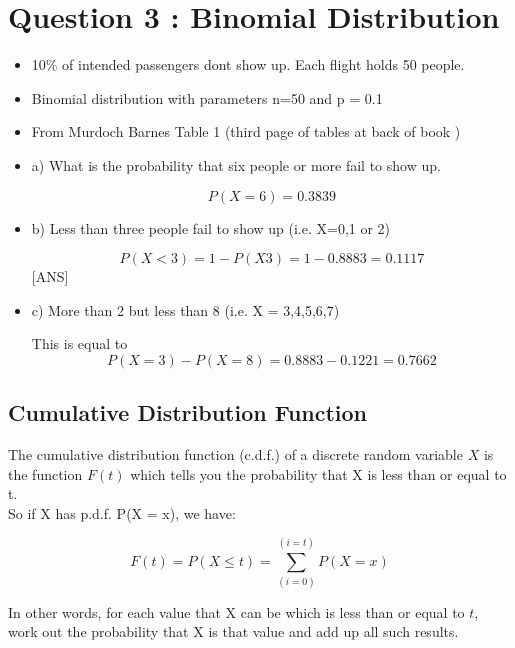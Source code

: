 \documentclass[]{report}
\begin{document}
\section{Question 3 : Binomial Distribution}

\begin{itemize}
	\item 10\% of intended passengers dont show up. Each flight holds 50 people.
	
	\item Binomial distribution with parameters n=50 and p = 0.1
	
	\item From Murdoch Barnes Table 1 (third page of tables at back of book )
\end{itemize}
\begin{itemize}
	\item a) What is the probability that six people or more fail to show up.
	
	\[P(X=6) =0.3839\]
	
	\item 	b) Less than three people fail to show up (i.e. X=0,1 or 2)
	
	\[P(X < 3) = 1- P(X3) =    1 - 0.8883  = 0.1117\] [ANS]
	
	
	\item c) More than 2 but less than 8   (i.e. X = 3,4,5,6,7)
	
	This is equal to \[P(X=3) - P(X=8) = 0.8883 -0.1221 =  0.7662\]
	
\end{itemize}




\subsection{Cumulative Distribution Function}

The cumulative distribution function (c.d.f.) of a discrete random variable $X$ is the function $F(t)$ which tells you the probability that X is less than or equal to t. \\ So if X has p.d.f. P(X = x), we have:

\[ F(t) = P(X \leq t) = \sum_{(i=0)}^{(i=t)} P(X = x) \]

In other words, for each value that X can be which is less than or equal to $t$, work out the probability that X is that value and add up all such results.
\end{document}
